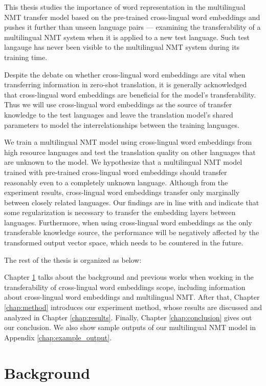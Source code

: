 \documentclass[thesis,fonts=libertine]{cluu}
\begin{document}
This thesis studies the importance of word representation in the multilingual NMT transfer model based on the pre-trained cross-lingual word embeddings \parencite{Bojanowski:2016aa,Ammar:2016aa,Joulin:2018aa,Ruder:2019aa} and pushes it further than unseen language pairs --- examining the transferability of a multilingual NMT system when it is applied to a new test language. Such test langauge has never been visible to the multilingual NMT system during its training time.

Despite the debate on whether cross-lingual word embeddings are vital when transferring information in zero-shot translation, it is generally acknowledged that cross-lingual word embeddings are beneficial for the model's transferability. Thus we will use cross-lingual word embeddings as the source of transfer knowledge to the test languages and leave the translation model's shared parameters to model the interrelationships between the training languages.

We train a multilingual NMT model using cross-lingual word embeddings from high resource languages and test the translation quality on other languages that are unknown to the model. We hypothesize that a multilingual NMT model trained with pre-trained cross-lingual word embeddings should transfer reasonably even to a completely unknown language. Although from the experiment results, cross-lingual word embeddings transfer only marginally between closely related languages. Our findings are in line with \textcite{aji-etal-2020-neural} and indicate that some regularization is necessary to transfer the embedding layers between languages. Furthermore, when using cross-lingual word embeddings as the only transferable knowledge source, the performance will be negatively affected by the transformed output vector space, which needs to be countered in the future.

The rest of the thesis is organized as below:

Chapter \ref{chap:background} talks about the background and previous works when working in the transferability of cross-lingual word embeddings scope, including information about cross-lingual word embeddings and multilingual NMT. After that, Chapter \ref{chap:method} introduces our experiment method, whose results are discussed and analyzed in Chapter \ref{chap:results}. Finally, Chapter \ref{chap:conclusion} gives out our conclusion. We also show sample outputs of our multilingual NMT model in Appendix \ref{chap:example_output}.

\chapter{Background}
\label{chap:background}
\end{document}
